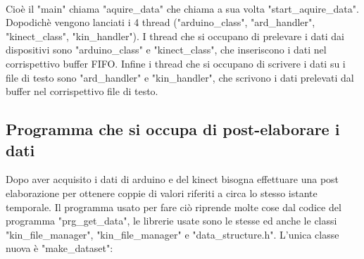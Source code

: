 \documentclass[10pt,a4paper]{article}
\begin{document}
\\
Cio\`e il "main" chiama "aquire\_data" che chiama a sua volta "start\_aquire\_data". Dopodich\`e vengono lanciati i 4 thread ("arduino\_class", "ard\_handler", "kinect\_class", "kin\_handler"). I thread che si occupano di prelevare i dati dai dispositivi sono "arduino\_class" e "kinect\_class", che inseriscono i dati nel corrispettivo buffer FIFO. Infine i thread che si occupano di scrivere i dati su i file di testo sono "ard\_handler" e "kin\_handler", che scrivono i dati prelevati dal buffer nel corrispettivo file di testo.


\subsection{Programma che si occupa di post-elaborare i dati}
Dopo aver acquisito i dati di arduino e del kinect bisogna effettuare una post elaborazione per ottenere coppie di valori riferiti a circa lo stesso istante temporale. 
Il programma usato per fare ci\`o riprende molte cose dal codice del programma "prg\_get\_data", le librerie usate sono le stesse ed anche le classi "kin\_file\_manager", "kin\_file\_manager" e "data\_structure.h".
L'unica classe nuova \`e "make\_dataset":
\end{document}

